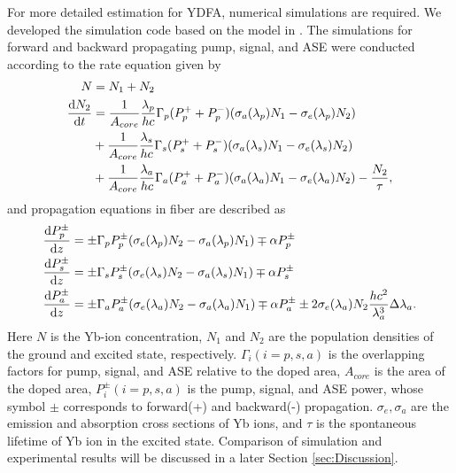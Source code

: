 \documentclass{osa-article}
\begin{document}
For more detailed estimation for YDFA, numerical simulations are required.
We developed the simulation code based on the model in \cite{roeser200894}.
The simulations for forward and backward propagating pump, signal, and ASE were conducted according to the rate equation given by
\begin{equation}
  \begin{split}
    N &= N_{1} + N_{2}\\
    \dv{N_{2}}{t} &= \frac{1}{A_{core}} \frac{\lambda_{p}}{hc}\Gamma_{p} (P^{+}_{p} + P^{-}_{p}) (\sigma_{a}(\lambda_{p})N_{1} - \sigma_{e}(\lambda_{p})N_{2})\\
    &+ \frac{1}{A_{core}} \frac{\lambda_{s}}{hc}\Gamma_{s} (P^{+}_{s} + P^{-}_{s}) (\sigma_{a}(\lambda_{s})N_{1} - \sigma_{e}(\lambda_{s})N_{2})\\
    &+ \frac{1}{A_{core}} \frac{\lambda_{a}}{hc}\Gamma_{a} (P^{+}_{a} + P^{-}_{a}) (\sigma_{a}(\lambda_{a})N_{1} - \sigma_{e}(\lambda_{a})N_{2}) - \frac{N_{2}}{\tau},
  \end{split}
\end{equation} 
and propagation equations in fiber are described as
\begin{align}
  \dv{P^{\pm}_{p}}{z} &= \pm\Gamma_{p}P^{\pm}_{p}(\sigma_{e}(\lambda_{p})N_{2} - \sigma_{a}(\lambda_{p})N_{1}) \mp \alpha P^{\pm}_{p}\\
  \dv{P^{\pm}_{s}}{z} &= \pm\Gamma_{s}P^{\pm}_{s}(\sigma_{e}(\lambda_{s})N_{2} - \sigma_{a}(\lambda_{s})N_{1}) \mp \alpha P^{\pm}_{s}\\
  \dv{P^{\pm}_{a}}{z} &= \pm\Gamma_{a}P^{\pm}_{a}(\sigma_{e}(\lambda_{a})N_{2} - \sigma_{a}(\lambda_{a})N_{1}) \mp \alpha P^{\pm}_{a} \pm 2\sigma_{e}(\lambda_{a})N_{2}\frac{hc^{2}}{\lambda_{a}^{3}}\Delta\lambda_{a}.
\end{align}
Here $N$ is the Yb-ion concentration, $N_{1}$ and $N_{2}$ are the population densities of the ground and excited state, respectively.
$\Gamma_{i} (i = p, s, a)$ is the overlapping factors for pump, signal, and ASE relative to the doped area, $A_{core}$ is the area of the doped area, $P^{\pm}_{i} (i = p, s, a)$ is the pump, signal, and ASE power, whose symbol $\pm$ corresponds to forward(+) and backward(-) propagation.
$\sigma_{e}, \sigma_{a}$ are the emission and absorption cross sections of Yb ions, and $\tau$ is the spontaneous lifetime of Yb ion in the excited state.
Comparison of simulation and experimental results will be discussed in a later Section \ref{sec:Discussion}.
\end{document}
